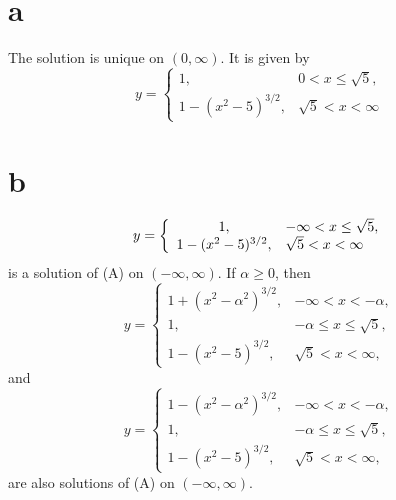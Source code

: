  \part{a}
 The solution is unique on $(0,\infty)$. It is given by
$$
y=
\left\{
\begin{array}{cl}
1,&0<x\le\sqrt{5},\\
1-(x^{2}-5)^{3/2},&\sqrt{5}<x<\infty
\end{array}\right.
$$
\quad \quad \part{b}
$$
\displaystyle y=\left\{
\begin{array}{cl}
 1,&-\infty<x\le\sqrt{5},\\
1-(x^{2}-5)^{3/2},&\sqrt{5}<x<\infty
\end{array}\right.
$$
is a solution of (A) on $(-\infty,\infty)$. If $\alpha\ge0$,
then
$$
y=\left\{
\begin{array}{cl}
 1+(x^{2}-\alpha^{2})^{3/2},&-\infty<x<-\alpha,\\
1,&-\alpha\le x\le\sqrt{5},\\
1-(x^{2}-5)^{3/2},&\sqrt{5}<x<\infty,
\end{array}\right. $$
and
$$
y=\left\{
\begin{array}{cl}
 1-(x^{2}-\alpha^{2})^{3/2},&-\infty<x<-\alpha,\\
1,&-\alpha\le x\le\sqrt{5},\\
1-(x^{2}-5)^{3/2},&\sqrt{5}<x<\infty,
\end{array}\right. $$
are also solutions of (A)  on $(-\infty,\infty)$.

